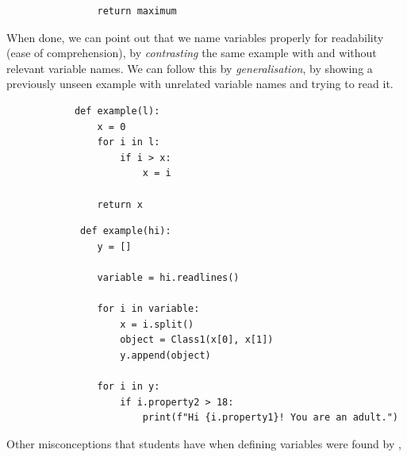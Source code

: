 \begin{description}
\begin{minipage}[t]{0.45\columnwidth}
\begin{verbatim}
                return maximum
      \end{verbatim}
    \end{minipage}
\newline
    \item [Fusion] When done, we can point out that we name variables 
properly for readability (ease of comprehension), by \emph{contrasting}
 the same example with and without relevant variable names. We can 
follow this by \emph{generalisation}, by showing a previously unseen 
example with unrelated variable names and trying to read it.
    
    \hfill
     \begin{minipage}[t]{0.45\columnwidth}
        \begin{verbatim}
            def example(l):
                x = 0
                for i in l:
                    if i > x:
                        x = i
    
                return x
        \end{verbatim}
    \end{minipage}
\hfill
    \begin{minipage}[t]{0.45\columnwidth}
        \begin{verbatim}
             def example(hi):
                y = []
                
                variable = hi.readlines()
    
                for i in variable:
                    x = i.split()
                    object = Class1(x[0], x[1])
                    y.append(object)
                    
                for i in y:
                    if i.property2 > 18:
                        print(f"Hi {i.property1}! You are an adult.")
        \end{verbatim}
    \end{minipage}
\hfill
    
\end{description}

Other misconceptions that students have when defining variables were found by 
\textcite{GuoMarkelZhang2020},

